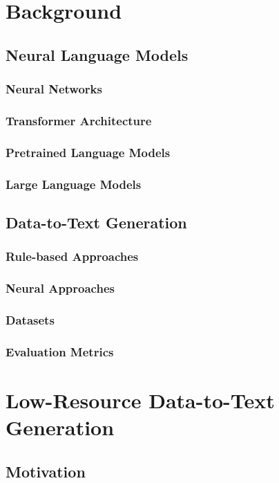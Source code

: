 \documentclass[12pt,notitlepage,a4paper,openright]{report}
\begin{document}
\chapter{Background}
\label{chap:background}
\section{Neural Language Models}
\label{sec:lms}
\subsection{Neural Networks}
\label{sec:nns}
\subsection{Transformer Architecture}
\label{sec:transformer}
\subsection{Pretrained Language Models}
\label{sec:plms}
\subsection{Large Language Models}
\label{sec:llms}
\section{Data-to-Text Generation}
\label{sec:d2t}
\subsection{Rule-based Approaches}
\label{sec:rule-d2t}
\subsection{Neural Approaches}
\label{sec:neural-d2t}
\subsection{Datasets}
\label{sec:datasets}
\subsection{Evaluation Metrics}
\label{sec:evaluation}

\chapter{Low-Resource Data-to-Text Generation}
\label{chap:low-res}
\section{Motivation}
\label{sec:low-res-mot}
\end{document}
